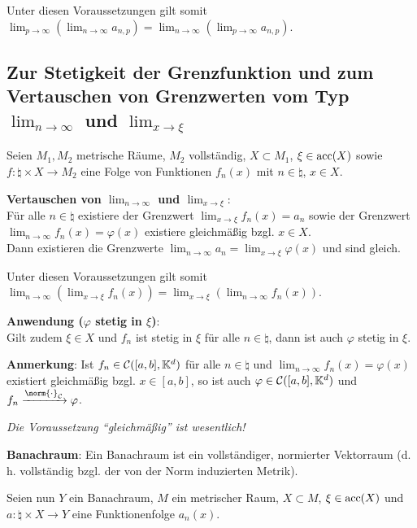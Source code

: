 Unter diesen Voraussetzungen gilt somit
$\lim_{p \to \infty} (\lim_{n \to \infty} a_{n,p}) =
\lim_{n \to \infty} (\lim_{p \to \infty} a_{n,p})$.

\subsection{%
    Zur Stetigkeit der Grenzfunktion und
    zum Vertauschen von Grenzwerten vom Typ
    \texorpdfstring
    {$\lim_{n \to \infty}$ und $\lim_{x \to \xi}$}%
    {n → ∞ und ξ → ∞}%
}

Seien $M_1, M_2$ metrische Räume, $M_2$ vollständig, $X \subset M_1$,
$\xi \in \operatorname{acc}(X)$ sowie $f: \natural \times X \rightarrow M_2$
eine Folge von Funktionen $f_n(x)$ mit $n \in \natural$, $x \in X$.

\textbf{Vertauschen von $\lim_{n \to \infty}$ und $\lim_{x \to \xi}$}: \\
Für alle $n \in \natural$ existiere der Grenzwert
$\lim_{x \to \xi} f_n(x) = a_n$
sowie der Grenzwert \\
$\lim_{n \to \infty} f_n(x) = \varphi(x)$ existiere
gleichmäßig bzgl. $x \in X$. \\
Dann existieren die Grenzwerte
$\lim_{n \to \infty} a_n = \lim_{x \to \xi} \varphi(x)$ und sind gleich.

Unter diesen Voraussetzungen gilt somit
$\lim_{n \to \infty} \left(\lim_{x \to \xi} f_n(x)\right) =
\lim_{x \to \xi} \left(\lim_{n \to \infty} f_n(x)\right)$.

\linie

\textbf{Anwendung ($\varphi$ stetig in $\xi$)}: \\
Gilt zudem $\xi \in X$ und $f_n$ ist stetig in $\xi$ für alle
$n \in \natural$, dann ist auch $\varphi$ stetig in $\xi$.

\textbf{Anmerkung}: Ist $f_n \in \mathcal{C}([a,b], \mathbb{K}^d)$ für alle
$n \in \natural$ und $\lim_{n \to \infty} f_n(x) = \varphi(x)$ existiert
gleichmäßig bzgl. $x \in [a,b]$, so ist auch
$\varphi \in \mathcal{C}([a,b], \mathbb{K}^d)$ und
$f_n \xrightarrow{\norm{\cdot}_\C} \varphi$.

\emph{Die Voraussetzung "`gleichmäßig"' ist wesentlich!}

\linie

\textbf{Banachraum}: Ein Banachraum ist ein vollständiger, normierter
Vektorraum (d.\,h. vollständig bzgl. der von der Norm induzierten Metrik).

Seien nun $Y$ ein Banachraum, $M$ ein metrischer Raum, $X \subset M$,
$\xi \in \operatorname{acc}(X)$ und $a: \natural \times X \rightarrow Y$ eine
Funktionenfolge $a_n(x)$.

